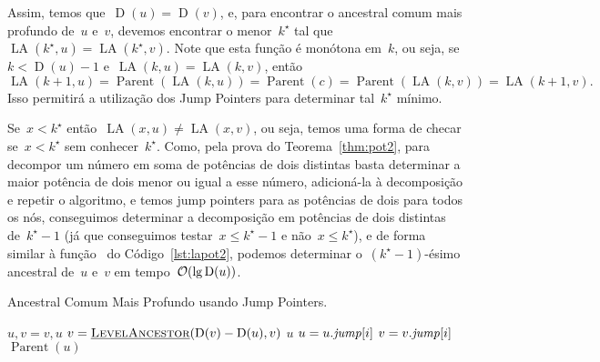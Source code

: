 \documentclass[main.tex]{subfiles}
\providecommand{\Par}{\operatorname{Parent}}
\newcommand{\LA}{\operatorname{LA}}
\newcommand{\Dep}{\operatorname{D}}
\begin{document}
\newcommand{\kb}{k^\star}

Assim, temos que~$\Dep(u) = \Dep(v)$, e, para encontrar o ancestral comum mais profundo de~$u$ e~$v$, devemos encontrar o menor~$\kb$ tal que~$\LA(\kb, u) = \LA(\kb, v)$. Note que esta função é monótona em~$k$, ou seja, se~${k < \Dep(u) - 1}$ e~${\LA(k, u) = \LA(k, v)}$, então
$${\LA(k + 1, u) = \Par(\LA(k, u)) = \Par(c) = \Par(\LA(k, v)) = \LA(k + 1, v).}$$
Isso permitirá a utilização dos Jump Pointers para determinar tal~$\kb$ mínimo.

Se~${x < \kb}$ então~${\LA(x, u) \neq \LA(x, v)}$, ou seja, temos uma forma de checar se~$x < \kb$ sem conhecer~$\kb$. Como, pela prova do Teorema~\ref{thm:pot2}, para decompor um número em soma de potências de dois distintas basta determinar a maior potência de dois menor ou igual a esse número, adicioná-la à decomposição e repetir o algoritmo, e temos jump pointers para as potências de dois para todos os nós, conseguimos determinar a decomposição em potências de dois distintas de~${\kb - 1}$ (já que conseguimos testar~${x \leq \kb - 1}$ e não~${x \leq \kb}$), e de forma similar à função~ do Código~\ref{lst:lapot2}, podemos determinar o~\mbox{$(\kb-1)$-ésimo} ancestral de~$u$ e~$v$ em tempo~$\Oh(\lg \Dep(u))$.

\begin{algorithm}
\caption{Ancestral Comum Mais Profundo usando Jump Pointers. \label{lst:lcapot2}}
\begin{algorithmic}[1]
		\If{$\Dep(u) > \Dep(v)$}
			\State $u, v = v, u$ \Comment{Garantindo que~$\Dep(u) \leq \Dep(v)$.}
		\EndIf
		\State $v = \funcAPI{LevelAncestor}{\Dep(v) - \Dep(u), v}$ 
		 \label{lst:lcapot2:if2}
			\State \Return $u$
		\EndIf
		\For{$i = \floor{\lg \Dep(u)} \DownTo 0$} \label{lst:lcapot2:for}
			 \label{lst:lcapot2:iffor}
				\State $u = u.\mathit{jump}[i]$
				\State $v = v.\mathit{jump}[i]$
			\EndIf
		\EndFor
		\State \Return $\Par(u)$
	\EndFunction
\end{algorithmic}
\end{algorithm}
\end{document}

